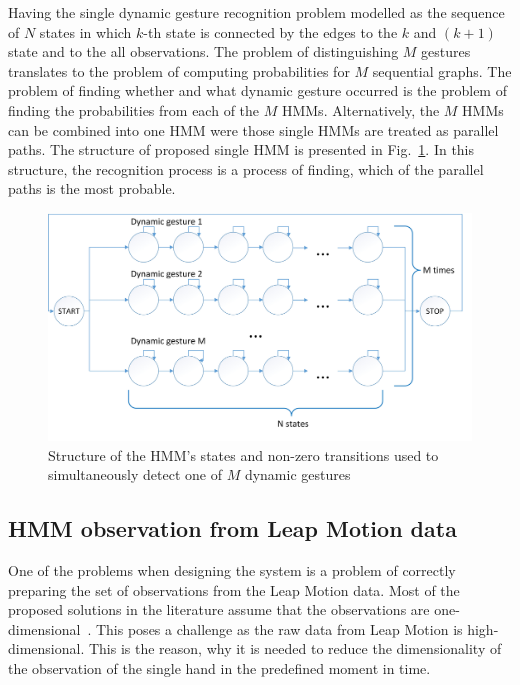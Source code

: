 Having the single dynamic gesture recognition problem modelled as the sequence of $N$ states in which $k$-th state is connected by the edges to the $k$ and $(k+1)$ state and to the all observations.
The problem of distinguishing $M$ gestures translates to the problem of computing probabilities for $M$ sequential graphs.
The problem of finding whether and what dynamic gesture occurred is the problem of finding the probabilities from each of the $M$ HMMs.
Alternatively, the $M$ HMMs can be combined into one HMM were those single HMMs are treated as parallel paths.
The structure of proposed single HMM is presented in Fig.~\ref{HMMstructure}.
In this structure, the recognition process is a process of finding, which of the parallel paths is the most probable.

\begin{figure}[htbp!]
\centering
 \includegraphics[width=1\columnwidth]{figures/HMM_eng.jpg}
 \caption{Structure of the HMM's states and non-zero transitions used to simultaneously detect one of $M$ dynamic gestures}
 \label{HMMstructure}
\end{figure}

\subsection{HMM observation from Leap Motion data}

One of the problems when designing the system is a problem of correctly preparing the set of observations from the Leap Motion data.
Most of the proposed solutions in the literature assume that the observations are one-dimensional~\cite{hmmtutorial, hmm}.
This poses a challenge as the raw data from Leap Motion is high-dimensional.
This is the reason, why it is needed to reduce the dimensionality of the observation of the single hand in the predefined moment in time.

